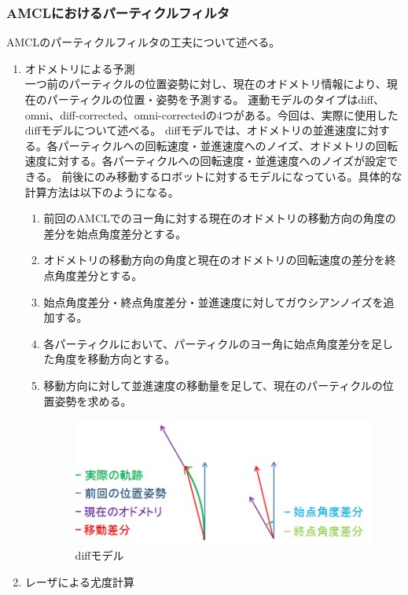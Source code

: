 \subsubsection{AMCLにおけるパーティクルフィルタ}
AMCLのパーティクルフィルタの工夫について述べる。
  \begin{enumerate}
    \item オドメトリによる予測\\
    一つ前のパーティクルの位置姿勢に対し、現在のオドメトリ情報により、現在のパーティクルの位置・姿勢を予測する。
    運動モデルのタイプはdiff、omni、diff-corrected、omni-correctedの4つがある。今回は、実際に使用したdiffモデルについて述べる。
    diffモデルでは、オドメトリの並進速度に対する。各パーティクルへの回転速度・並進速度へのノイズ、オドメトリの回転速度に対する。各パーティクルへの回転速度・並進速度へのノイズが設定できる。
    前後にのみ移動するロボットに対するモデルになっている。具体的な計算方法は以下のようになる。
    \begin{enumerate}
      \item 前回のAMCLでのヨー角に対する現在のオドメトリの移動方向の角度の差分を始点角度差分とする。
      \item オドメトリの移動方向の角度と現在のオドメトリの回転速度の差分を終点角度差分とする。
      \item 始点角度差分・終点角度差分・並進速度に対してガウシアンノイズを追加する。
      \item 各パーティクルにおいて、パーティクルのヨー角に始点角度差分を足した角度を移動方向とする。
      \item 移動方向に対して並進速度の移動量を足して、現在のパーティクルの位置姿勢を求める。
      \begin{figure}[h]
        \begin{center}
          \includegraphics[width=.6\linewidth]{img/auto_17.jpg}
          \caption{diffモデル}
          \label{auto:navstack:diff}
        \end{center}
      \end{figure}
    \end{enumerate}
    \item レーザによる尤度計算\\

\end{enumerate}
